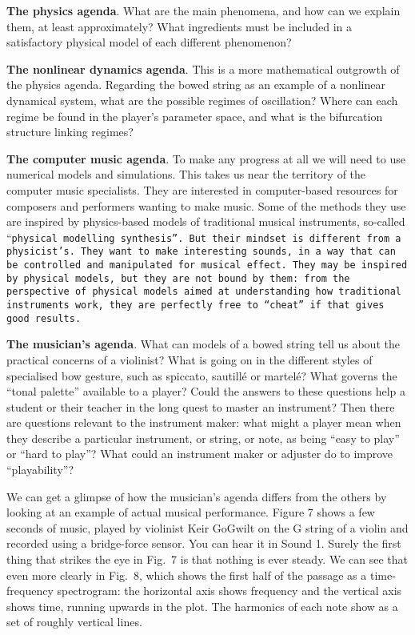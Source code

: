   \textbf{The physics agenda}. What are the main phenomena, and how can we 
  explain them, at least approximately? What ingredients must be included in a 
  satisfactory physical model of each different phenomenon? 

  \textbf{The nonlinear dynamics agenda}. This is a more mathematical outgrowth 
  of the physics agenda. Regarding the bowed string as an example of a 
  nonlinear dynamical system, what are the possible regimes of oscillation? 
  Where can each regime be found in the player’s parameter space, and what is 
  the bifurcation structure linking regimes? 

  \textbf{The computer music agenda}. To make any progress at all we will need 
  to use numerical models and simulations. This takes us near the territory of 
  the computer music specialists. They are interested in computer-based 
  resources for composers and performers wanting to make music. Some of the 
  methods they use are inspired by physics-based models of traditional musical 
  instruments, so-called “\tt{}physical modelling synthesis\rm{}”. But their 
  mindset is different from a physicist’s. They want to make interesting 
  sounds, in a way that can be controlled and manipulated for musical effect. 
  They may be inspired by physical models, but they are not bound by them: from 
  the perspective of physical models aimed at understanding how traditional 
  instruments work, they are perfectly free to “cheat” if that gives good 
  results. 

  \textbf{The musician’s agenda}. What can models of a bowed string tell us 
  about the practical concerns of a violinist? What is going on in the 
  different styles of specialised bow gesture, such as spiccato, sautillé or 
  martelé? What governs the “tonal palette” available to a player? Could the 
  answers to these questions help a student or their teacher in the long quest 
  to master an instrument? Then there are questions relevant to the instrument 
  maker: what might a player mean when they describe a particular instrument, 
  or string, or note, as being “easy to play” or “hard to play”? What could an 
  instrument maker or adjuster do to improve “playability”? 

  We can get a glimpse of how the musician’s agenda differs from the others by 
  looking at an example of actual musical performance. Figure 7 shows a few 
  seconds of music, played by violinist Keir GoGwilt on the G string of a 
  violin and recorded using a bridge-force sensor. You can hear it in Sound 1. 
  Surely the first thing that strikes the eye in Fig.\ 7 is that nothing is 
  ever steady. We can see that even more clearly in Fig.\ 8, which shows the 
  first half of the passage as a time-frequency spectrogram: the horizontal 
  axis shows frequency and the vertical axis shows time, running upwards in the 
  plot. The harmonics of each note show as a set of roughly vertical lines. 

